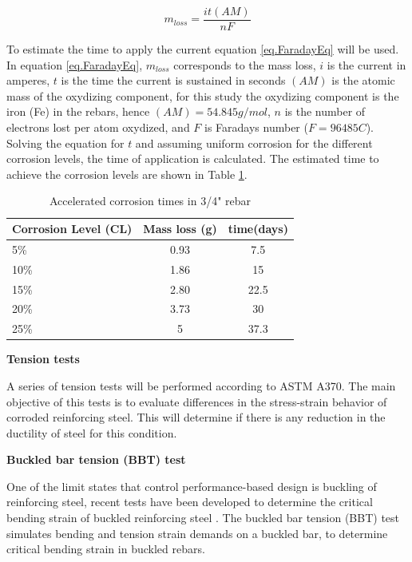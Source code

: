 \begin{equation}
	m_{loss}=\frac{it(AM)}{nF}
	\label{eq.FaradayEq}
\end{equation}

To estimate the time to apply the current equation \ref{eq.FaradayEq} will be used. In equation \ref{eq.FaradayEq}, $m_{loss}$ corresponds to the mass loss, $i$ is the current in amperes, $t$ is the time the current is sustained in seconds $(AM)$ is the atomic mass of the oxydizing component, for this study the oxydizing component is the iron (Fe) in the rebars, hence $(AM)=54.845g/mol$, $n$ is the number of electrons lost per atom oxydized, and $F$ is Faradays number ($F=96485 C$). Solving the equation for $t$ and assuming uniform corrosion for the different corrosion levels, the time of application is calculated. The estimated time to achieve the corrosion levels are shown in Table \ref{tab:AcceleratedCorrosionTime}. 

\begin{table}[htbp]
	\caption{Accelerated corrosion times in 3/4" rebar}
	\label{tab:AcceleratedCorrosionTime}
	\centering	
		\begin{tabular}{|l|c|c|}
		\hline
		Corrosion Level (CL) & Mass loss (g)   & time(days)     \\  \hline	
		5\%                  & 0.93            & 7.5    \\  \hline	
		10\%                 & 1.86            & 15     \\  \hline	
		15\%                 & 2.80            & 22.5   \\  \hline	
		20\%                 & 3.73            & 30     \\  \hline	
		25\%                 & 5            & 37.3   \\  \hline	
		\end{tabular}
\end{table}
\newpage

\textbf{Tension tests}

A series of tension tests will be performed according to ASTM A370. The main objective of this tests is to evaluate differences in the stress-strain behavior of corroded reinforcing steel. This will determine if there is any reduction in the ductility of steel for this condition.
\newline

\textbf{Buckled bar tension (BBT) test}

One of the limit states that control performance-based design is buckling of reinforcing steel, recent tests have been developed to determine the critical bending strain of buckled reinforcing steel \cite{Barcley2019}. The buckled bar tension (BBT) test simulates bending and tension strain demands on a buckled bar, to determine critical bending strain in buckled rebars. 

